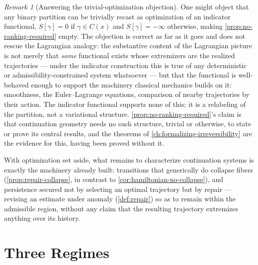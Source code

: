 \documentclass[11pt]{book}
\theoremstyle{plain}
\theoremstyle{definition}
\theoremstyle{remark}
\newtheorem{remark}[theorem]{Remark}
\begin{document}
\begin{remark}[Answering the trivial-optimization objection]
\label{rem:trivial-optimization}
One might object that any binary partition can be trivially recast as
optimization of an indicator functional, $S[\gamma] = 0$ if $\gamma \in
C(x)$ and $S[\gamma] = -\infty$ otherwise, making
\cref{prop:no-ranking-required} empty. The objection is correct as far
as it goes and does not rescue the Lagrangian analogy: the substantive
content of the Lagrangian picture is not merely that \emph{some}
functional exists whose extremizers are the realized trajectories ---
under the indicator construction this is true of any deterministic or
admissibility-constrained system whatsoever --- but that the
functional is well-behaved enough to support the machinery
classical mechanics builds on it: smoothness, the Euler--Lagrange
equations, comparison of nearby trajectories by their action. The
indicator functional supports none of this; it is a relabeling of the
partition, not a variational structure. \cref{prop:no-ranking-required}'s
claim is that continuation geometry needs no such structure, trivial
or otherwise, to state or prove its central results, and the theorems
of \cref{ch:formalizing-irreversibility} are the evidence for this,
having been proved without it.
\end{remark}

With optimization set aside, what remains to characterize continuation
systems is exactly the machinery already built: transitions that
generically do collapse fibers (\cref{prop:repair-collapse}, in
contrast to \cref{cor:hamiltonian-no-collapse}), and persistence
secured not by selecting an optimal trajectory but by repair
--- revising an estimate under anomaly (\cref{def:repair}) so as to
remain within the admissible region, without any claim that the
resulting trajectory extremizes anything over its history.

\section{Three Regimes}
\end{document}
